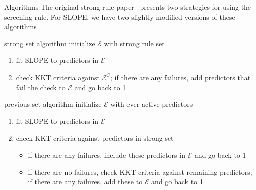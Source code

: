 \documentclass[10pt,ignorenonframetext]{beamer}
\begin{document}
\begin{frame}{Algorithms}
The original strong rule paper~\autocite{tibshirani2012} presents two
strategies for using the screening rule.  For SLOPE, we have two \alert{slightly}
modified versions of these algorithms

\begin{block}{strong set algorithm}
initialize \(\mathcal{E}\) with strong rule set
\begin{enumerate}
    \item fit SLOPE to predictors in \(\mathcal{E}\)
    \item check KKT criteria against \(\mathcal{E}^C\); 
              if there are any failures, add predictors that
              fail the check to \(\mathcal{E}\) and go back to 1
\end{enumerate}
\end{block}
\pause
\begin{block}{previous set algorithm}
initialize \(\mathcal{E}\) with ever-active predictors
\begin{enumerate}
    \item fit SLOPE to predictors in \(\mathcal{E}\)
    \item check KKT criteria against predictors in \alert{strong} set
        \begin{itemize}
            \item if there are any failures, include these predictors in \(\mathcal{E}\) and
                  go back to 1
            \item if there are no failures, check KKT criteria against remaining predictors;
                  if there are any failures, add these to \(\mathcal{E}\) and go back to 1
        \end{itemize}
\end{enumerate}
\end{block}
\end{frame}
\end{document}
